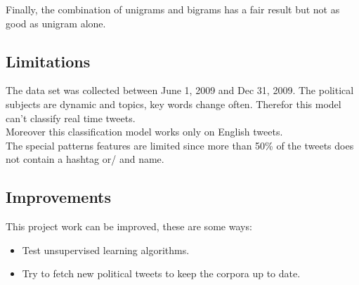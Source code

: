 Finally, the combination of unigrams and bigrams has a fair result but not as good as unigram alone.
 
\subsection{Limitations}
The data set was collected between June 1, 2009 and Dec 31, 2009. The political subjects are dynamic and topics, key words change often. Therefor this model can't classify real time tweets.\\
Moreover this classification model works only on English tweets.\\
The special patterns features are limited since more than 50\% of the tweets does not contain a hashtag or/ and name.
\subsection{Improvements}
This project work can be improved, these are some ways:
\begin{itemize}
\item Test unsupervised learning algorithms.
\item Try to fetch new political tweets to keep the corpora up to date.
\end{itemize}
